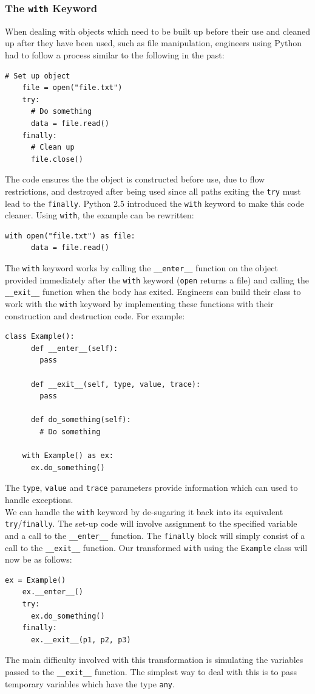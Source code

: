 \documentclass[12pt, titlepage]{article}
\begin{document}
\subsubsection{The \texttt{with} Keyword}
When dealing with objects which need to be built up before their use and cleaned up after they have been used, such as file manipulation, engineers using Python had to follow a process similar to the following in the past:
\begin{lstlisting}[mathescape]
    # Set up object
    file = open("file.txt")
    try:
      # Do something
      data = file.read()
    finally:
      # Clean up
      file.close()
\end{lstlisting}
The code ensures the the object is constructed before use, due to flow restrictions, and destroyed after being used since all paths exiting the \texttt{try} must lead to the \texttt{finally}. Python 2.5 introduced the \texttt{with} keyword to make this code cleaner. Using \texttt{with}, the example can be rewritten:
\begin{lstlisting}[mathescape]
    with open("file.txt") as file:
      data = file.read()
\end{lstlisting}
The \texttt{with} keyword works by calling the \texttt{\_\_enter\_\_} function on the object provided immediately after the \texttt{with} keyword (\texttt{open} returns a file) and calling the \texttt{\_\_exit\_\_} function when the body has exited. Engineers can build their class to work with the \texttt{with} keyword by implementing these functions with their construction and destruction code. For example:
\begin{lstlisting}[mathescape]
    class Example():
      def __enter__(self):
        pass
			
      def __exit__(self, type, value, trace):
        pass
			
      def do_something(self):
        # Do something
			
    with Example() as ex:
      ex.do_something()
\end{lstlisting}
The \texttt{type}, \texttt{value} and \texttt{trace} parameters provide information which can used to handle exceptions. \\
\indent We can handle the \texttt{with} keyword by de-sugaring it back into its equivalent \texttt{try}/\texttt{finally}. The set-up code will involve assignment to the specified variable and a call to the \texttt{\_\_enter\_\_} function. The \texttt{finally} block will simply consist of a call to the \texttt{\_\_exit\_\_} function. Our transformed \texttt{with} using the \texttt{Example} class will now be as follows:
\begin{lstlisting}[mathescape]
    ex = Example()
    ex.__enter__()
    try:
      ex.do_something()
    finally:
      ex.__exit__(p1, p2, p3)
\end{lstlisting}
The main difficulty involved with this transformation is simulating the variables passed to the \texttt{\_\_exit\_\_} function. The simplest way to deal with this is to pass temporary variables which have the type \texttt{any}.
\end{document}
